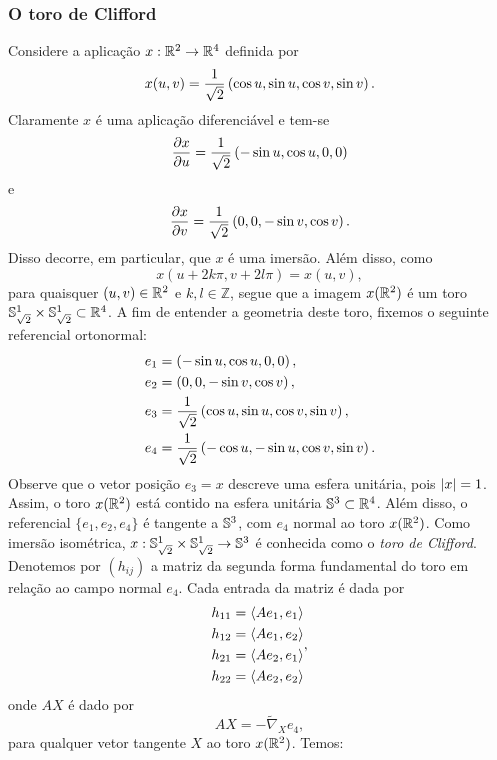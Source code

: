 \documentclass[12pt,a4paper]{beamer}
\theoremstyle{definition}
\begin{document}
\begin{frame}[allowframebreaks]
	\frametitle{O toro de Clifford}
	
	Considere a aplicação $x: \mathbb R^2 \rightarrow \mathbb R^4$ definida por
	\begin{equation}\label{def:toro-de-clifford}
	x(u,v) = \frac{1}{\sqrt{2}} \left( \cos u, \sin u, \cos v, \sin v \right).
	\end{equation}
	Claramente $x$ é uma aplicação diferenciável e tem-se
	\[ \frac{\partial x}{\partial u} = \frac{1}{\sqrt{2}} \left( -\sin u, \cos u, 0, 0 \right) \]
	e
	\[ \frac{\partial x}{\partial v} = \frac{1}{\sqrt{2}} \left( 0,0, -\sin v, \cos v \right). \]
	Disso decorre, em particular, que $x$ é uma imersão. Além disso, como 
	\[x(u + 2k \pi, v + 2l \pi) = x(u,v), \] 
	para quaisquer $(u,v) \in \mathbb R^2$ e $k,l \in \mathbb{Z}$, segue que a imagem $x(\mathbb R^2)$ é um toro $\mathbb{S}_{\sqrt{2}}^1 \times \mathbb{S}_{\sqrt{2}}^1 \subset \mathbb R^4$. A fim de entender a geometria deste toro, fixemos o seguinte referencial ortonormal:
	\begin{align*}
	e_1 &= \left( -\sin u, \cos u, 0, 0 \right),\\
	e_2 &= \left( 0, 0, -\sin v, \cos v \right),\\
	e_3 &= \frac{1}{\sqrt{2}} \left( \cos u, \sin u, \cos v, \sin v \right),\\
	e_4 &= \frac{1}{\sqrt{2}} \left( -\cos u, -\sin u, \cos v, \sin v \right).
	\end{align*}
	Observe que o vetor posição $e_3 = x$ descreve uma esfera unitária, pois $\left| x \right| = 1$. Assim, o toro $x(\mathbb R^2)$ está contido na esfera unitária $\mathbb{S}^3 \subset \mathbb R^4$. Além disso, o referencial $\{e_1,e_2,e_4\}$ é tangente a $\mathbb{S}^3$, com
	$e_4$ normal ao toro $x(\mathbb R^2)$. Como imersão isométrica, $x: \mathbb{S}_{\sqrt{2}}^1 \times \mathbb{S}_{\sqrt{2}}^1 \rightarrow \mathbb{S}^3$ é conhecida como o \emph{toro de Clifford}. Denotemos por $(h_{ij})$ a matriz da segunda forma fundamental do toro em relação ao campo normal $e_4$. Cada entrada da matriz é dada por
	\begin{equation*}
	\begin{split}
	h_{11} &= \left\langle A e_1,e_1 \right\rangle\\
	h_{12} &= \left\langle A e_1,e_2 \right\rangle\\
	h_{21} &= \left\langle A e_2,e_1 \right\rangle\\
	h_{22} &= \left\langle A e_2,e_2 \right\rangle
	\end{split},
	\end{equation*}
	onde $AX$ é dado por
	\[ AX = -\tilde{\nabla}_X e_4, \]
	para qualquer vetor tangente $X$ ao toro $x(\mathbb R^2)$. Temos:

\end{frame}
\end{document}

